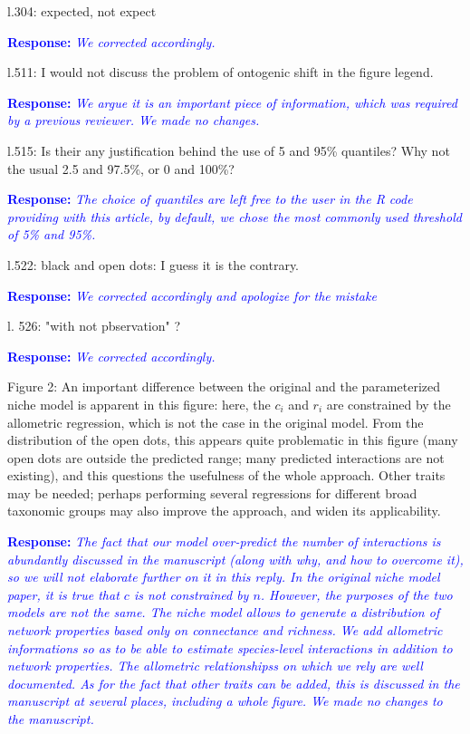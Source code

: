 \documentclass [12pt,onecolumn,twoside,openright]{report}
\begin{document}
\begin{onehalfspacing}
\medskip l.304: expected, not expect

\textcolor{blue}{\textbf{Response:}} \textit{\textcolor{blue}{We corrected
accordingly.}}

\medskip l.511: I would not discuss the problem of ontogenic
shift in the figure legend.

\textcolor{blue}{\textbf{Response:}} \textit{\textcolor{blue}{We argue it is an
important piece of information, which was required by a previous reviewer. We
made no changes.}}

\medskip l.515: Is their any justification behind the use of 5
and 95\% quantiles? Why not the usual 2.5 and 97.5\%, or 0 and 100\%?

\textcolor{blue}{\textbf{Response:}} \textit{\textcolor{blue}{The choice of quantiles are left free to the user in the R code providing with this article, by default, we chose the most commonly used threshold of 5\% and 95\%. }}

\medskip l.522: black and open dots: I guess it is the
contrary.

\textcolor{blue}{\textbf{Response:}} \textit{\textcolor{blue}{We corrected accordingly and apologize for the mistake}}

\medskip l. 526: "with not pbservation" ?

\textcolor{blue}{\textbf{Response:}} \textit{\textcolor{blue}{We corrected
accordingly.}}

\medskip Figure 2: An important difference between the
original and the parameterized niche model is apparent in this figure: here, the
$c_i$ and $r_i$ are constrained by the allometric regression, which is not the
case in the original model. From the distribution of the open dots, this appears
quite problematic in this figure (many open dots are outside the predicted
range; many predicted interactions are not existing), and this questions the
usefulness of the whole approach. Other traits may be needed; perhaps performing
several regressions for different broad taxonomic groups may also improve the
approach, and widen its applicability.

\textcolor{blue}{\textbf{Response:}} \textit{\textcolor{blue}{The fact that our
model over-predict the number of interactions is abundantly discussed in the
manuscript (along with why, and how to overcome it), so we will not elaborate
further on it in this reply. In the original niche model paper, it is true
that $c$ is not constrained by $n$. However, the purposes of the two models are
not the same. The niche model allows to generate a distribution of network
properties based only on connectance and richness. We add allometric
informations so as to be able to estimate species-level interactions in addition
to network properties. The allometric relationshipss on which we rely are well
documented. As for the fact that other traits can be added, this is discussed in
the manuscript at several places, including a whole figure. We made no changes
to the manuscript.}}

\end{onehalfspacing}
\end{document}
